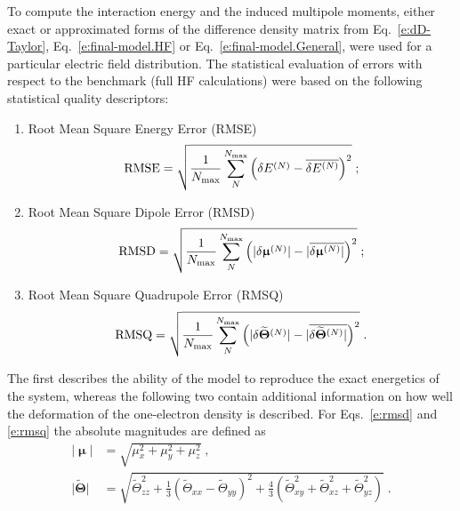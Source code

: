 \documentclass[aip,jcp,preprint,amsmath,amssymb,floatfix]{revtex4-1}
\newcommand{\BM}[1]{\bm{#1}}
\begin{document}
To compute the interaction energy and the induced multipole moments, either exact or approximated forms
of the difference density matrix from Eq.~\eqref{e:dD-Taylor}, Eq.~\eqref{e:final-model.HF} or Eq.~\eqref{e:final-model.General},
were used for a particular electric field distribution. The statistical evaluation of
errors with respect to the benchmark (full HF calculations) were based on 
the following statistical quality descriptors:
%
\begin{enumerate}
 \item Root Mean Square Energy Error (RMSE)
   \begin{equation}\label{e:rmse}
     {\rm RMSE} = \sqrt{ \frac{1}{N_{\rm max}} \sum_N^{N_{\rm max}} \left( \delta E^{(N)} - \overline{\delta E^{(N)}}\right)^2 } \;;
   \end{equation}
 \item Root Mean Square Dipole Error (RMSD)
   \begin{equation}\label{e:rmsd}
     {\rm RMSD} = \sqrt{ \frac{1}{N_{\rm max}}\sum_N^{N_{\rm max}} \left( \lvert \delta {\BM\upmu}^{(N)} \rvert 
                                             - \lvert \overline{\delta {\BM\upmu}^{(N)} \rvert }\right)^2 } \;;
   \end{equation}
 \item Root Mean Square Quadrupole Error (RMSQ)
   \begin{equation}\label{e:rmsq}
     {\rm RMSQ} = \sqrt{ \frac{1}{N_{\rm max}}\sum_N^{N_{\rm max}} \left( \lvert \delta \widetilde{\BM\Theta}^{(N)} \rvert 
                                             - \lvert \overline{\delta \widetilde{\BM\Theta}^{(N)} \rvert }\right)^2 } \;.
   \end{equation}
\end{enumerate}
%
The first describes the ability of the model to reproduce the exact energetics of the system, 
whereas the following two contain additional information on how well the deformation of the one\hyp{}electron
density is described. For Eqs.~\eqref{e:rmsd} and \eqref{e:rmsq} the absolute magnitudes
are defined as
%
\begin{subequations}\label{e:absmagn}
  \begin{align}
   \lvert {\BM\upmu} \rvert &= \sqrt{\mu_x^2+\mu_y^2+\mu_z^2} \;,\\
   \lvert {\widetilde{\BM\Theta}}\rvert &= 
          \sqrt{\widetilde{\Theta}_{zz}^2 + \frac{1}{3}\left(\widetilde{\Theta}_{xx}-\widetilde{\Theta}_{yy}\right)^2 
          + \frac{4}{3}\left( \widetilde{\Theta}_{xy}^2 + \widetilde{\Theta}_{xz}^2 + \widetilde{\Theta}_{yz}^2 \right)} \;. 
  \end{align}
\end{subequations}
\end{document}
